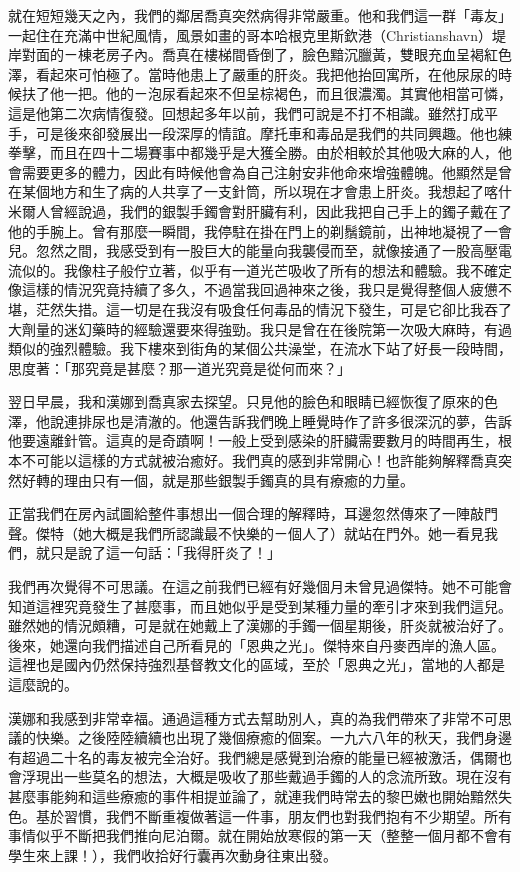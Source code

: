 就在短短幾天之內，我們的鄰居喬真突然病得非常嚴重。他和我們這一群「毒友」一起住在充滿中世紀風情，風景如畫的哥本哈根克里斯欽港（Christianshavn）堤岸對面的ㄧ棟老房子內。喬真在樓梯間昏倒了，臉色黯沉臘黃，雙眼充血呈褐紅色澤，看起來可怕極了。當時他患上了嚴重的肝炎。我把他抬回寓所，在他尿尿的時候扶了他一把。他的ㄧ泡尿看起來不但呈棕褐色，而且很濃濁。其實他相當可憐，這是他第二次病情復發。回想起多年以前，我們可說是不打不相識。雖然打成平手，可是後來卻發展出一段深厚的情誼。摩托車和毒品是我們的共同興趣。他也練拳擊，而且在四十二場賽事中都幾乎是大獲全勝。由於相較於其他吸大麻的人，他會需要更多的體力，因此有時候他會為自己注射安非他命來增強體魄。他顯然是曾在某個地方和生了病的人共享了一支針筒，所以現在才會患上肝炎。我想起了喀什米爾人曾經說過，我們的銀製手鐲會對肝臟有利，因此我把自己手上的鐲子戴在了他的手腕上。曾有那麼一瞬間，我停駐在掛在門上的剃鬚鏡前，出神地凝視了一會兒。忽然之間，我感受到有一股巨大的能量向我襲侵而至，就像接通了一股高壓電流似的。我像柱子般佇立著，似乎有一道光芒吸收了所有的想法和體驗。我不確定像這樣的情況究竟持續了多久，不過當我回過神來之後，我只是覺得整個人疲憊不堪，茫然失措。這一切是在我沒有吸食任何毒品的情況下發生，可是它卻比我吞了大劑量的迷幻藥時的經驗還要來得強勁。我只是曾在在後院第一次吸大麻時，有過類似的強烈體驗。我下樓來到街角的某個公共澡堂，在流水下站了好長一段時間，思度著：「那究竟是甚麼？那一道光究竟是從何而來？」

翌日早晨，我和漢娜到喬真家去探望。只見他的臉色和眼睛已經恢復了原來的色澤，他說連排尿也是清澈的。他還告訴我們晚上睡覺時作了許多很深沉的夢，告訴他要遠離針管。這真的是奇蹟啊！一般上受到感染的肝臟需要數月的時間再生，根本不可能以這樣的方式就被治癒好。我們真的感到非常開心！也許能夠解釋喬真突然好轉的理由只有一個，就是那些銀製手鐲真的具有療癒的力量。

正當我們在房內試圖給整件事想出一個合理的解釋時，耳邊忽然傳來了一陣敲門聲。傑特（她大概是我們所認識最不快樂的ㄧ個人了）就站在門外。她一看見我們，就只是說了這一句話：「我得肝炎了！」

我們再次覺得不可思議。在這之前我們已經有好幾個月未曾見過傑特。她不可能會知道這裡究竟發生了甚麼事，而且她似乎是受到某種力量的牽引才來到我們這兒。雖然她的情況頗糟，可是就在她戴上了漢娜的手鐲一個星期後，肝炎就被治好了。後來，她還向我們描述自己所看見的「恩典之光」。傑特來自丹麥西岸的漁人區。這裡也是國內仍然保持強烈基督教文化的區域，至於「恩典之光」，當地的人都是這麼說的。

漢娜和我感到非常幸福。通過這種方式去幫助別人，真的為我們帶來了非常不可思議的快樂。之後陸陸續續也出現了幾個療癒的個案。一九六八年的秋天，我們身邊有超過二十名的毒友被完全治好。我們總是感覺到治療的能量已經被激活，偶爾也會浮現出一些莫名的想法，大概是吸收了那些戴過手鐲的人的念流所致。現在沒有甚麼事能夠和這些療癒的事件相提並論了，就連我們時常去的黎巴嫩也開始黯然失色。基於習慣，我們不斷重複做著這一件事，朋友們也對我們抱有不少期望。所有事情似乎不斷把我們推向尼泊爾。就在開始放寒假的第一天（整整一個月都不會有學生來上課！），我們收拾好行囊再次動身往東出發。

